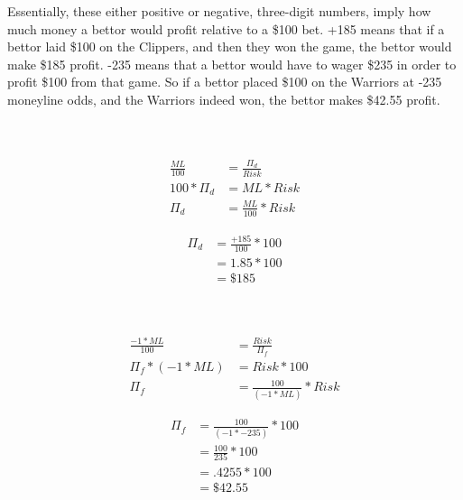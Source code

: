 \documentclass [MS] {uclathes}
\begin{document}
\noindent Essentially, these either positive or negative, three-digit numbers, imply how much money a bettor would profit relative to a \$100 bet. +185 means that if a bettor laid \$100 on the Clippers, and then they won the game, the bettor would make \$185 profit. -235 means that a bettor would have to wager \$235 in order to profit \$100 from that game. So if a bettor placed \$100 on the Warriors at -235 moneyline odds, and the Warriors indeed won, the bettor makes \$42.55 profit. 

\noindent {} \\
 \\
\begin{equation} \label{ml_prof_dog}
\begin{split}
\frac{ML}{100}  & = \frac{\Pi_{d}}{Risk}  \\
100*\Pi_{d} & = ML*Risk    \\
\Pi_{d} & = \frac{ML}{100} * Risk 
\end{split}
\end{equation}

\noindent {}
\begin{equation*} 
\begin{split}
\Pi_{d} & = \frac{+185}{100} * 100 \\
 & = 1.85 * 100 \\
 & = \$185
\end{split}
\end{equation*}


\noindent {} \\
 \\
\begin{equation} \label{ml_prof_fav}
\begin{split}
\frac{-1 * ML}{100}  & = \frac{Risk}{\Pi_{f}}  \\
\Pi_{f} * (-1 * ML) & = Risk * 100  \\
\Pi_{f} & = \frac{100}{(-1 * ML)} * Risk 
\end{split}
\end{equation}

\noindent {}
\begin{equation*} 
\begin{split}
\Pi_{f} & =  \frac{100}{(-1 * -235)} * 100 \\
 & = \frac{100}{235} * 100 \\
 & = .4255 * 100 \\
 & = \$42.55
\end{split}
\end{equation*}
\end{document}
